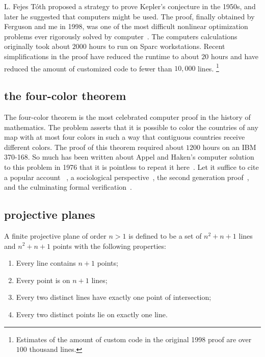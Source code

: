 \documentclass{llncs}
\begin{document}

L. Fejes T\'oth proposed a strategy to prove Kepler's conjecture in
the 1950s, and later he suggested that computers might be used.  The
proof, finally obtained by Ferguson and me in 1998, was one of the
most difficult nonlinear optimization problems ever rigorously solved
by computer~\cite{Hales:2005:Annals}.  The computers calculations
originally took about $2000$ hours to run on Sparc workstations.
Recent simplifications in the proof have reduced the runtime to about
$20$ hours and have reduced the amount of customized code to fewer
than $10,000$ lines.%
\footnote{Estimates of the amount of custom code in the original 1998
  proof are over $100$ thousand lines.}


\subsection{the four-color theorem}

The four-color theorem is the most celebrated computer proof in the
history of mathematics.  The problem asserts that it is possible to
color the countries of any map with at most four colors in such a way
that contiguous countries receive different colors.  The proof of this
theorem required about $1200$ hours on an IBM 370-168. So much has
been written about Appel and Haken's computer solution to this problem
in 1976 that it is pointless to repeat it here~\cite{AH4CT}.  Let it
suffice to cite a popular account ~\cite{Wil4CT}, a sociological
perspective~\cite{Mac}, the second generation
proof~\cite{Robertson:1997:JCTB}, and the culminating formal
verification~\cite{gonthier:2008:formal}.




\subsection{projective planes}

A finite projective plane of order $n>1$ is defined to be a set of
$n^2 + n + 1$ lines and $n^2 + n+ 1$ points with the following
properties:
\begin{enumerate}
\item Every line contains $n+1$ points;
\item Every point is on $n+1$ lines;
\item Every two distinct lines have exactly one point of intersection;
\item Every two distinct points lie on exactly one line.
\end{enumerate}
\end{document}
